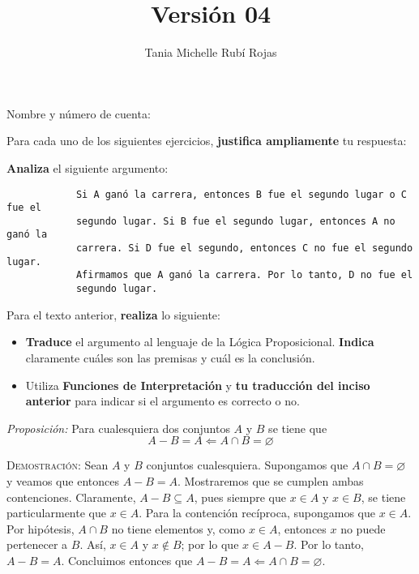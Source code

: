 \documentclass[oneside]{style}
\title{Versión 04}
\author{Tania Michelle Rubí Rojas}
\begin{document}
\maketitle

\vspace{5mm}
\noindent
Nombre y número de cuenta: \hrulefill\

\vspace*{5mm}
Para cada uno de los siguientes ejercicios, \textbf{justifica ampliamente} tu 
respuesta:

\begin{questions}[label=\protect\circled{\bfseries\arabic*}]

    \question
    {
        \textbf{Analiza} el siguiente argumento:
        \begin{verbatim}
            Si A ganó la carrera, entonces B fue el segundo lugar o C fue el 
            segundo lugar. Si B fue el segundo lugar, entonces A no ganó la 
            carrera. Si D fue el segundo, entonces C no fue el segundo lugar. 
            Afirmamos que A ganó la carrera. Por lo tanto, D no fue el 
            segundo lugar. 
        \end{verbatim}

        Para el texto anterior, \textbf{realiza} lo siguiente:
        \begin{itemize}
            \item \textbf{Traduce} el argumento al lenguaje de la Lógica 
            Proposicional. \textbf{Indica} claramente cuáles son las premisas y
            cuál es la conclusión. 
            
            \item Utiliza \textbf{Funciones de Interpretación} y \textbf{tu 
            traducción del inciso anterior} para indicar si el argumento es 
            correcto o no. 
        \end{itemize}
    }  

    \question
    {
        \textit{Proposición:} Para cualesquiera dos conjuntos $A$ y $B$ se tiene 
        que 
        \begin{equation*}
            A - B = A \Leftarrow A \cap B = \varnothing
        \end{equation*}

        \textsc{Demostración}: Sean $A$ y $B$ conjuntos cualesquiera. 
        Supongamos que $A \cap B = \varnothing$ y veamos que entonces 
        $A - B = A$. Mostraremos que se cumplen ambas contenciones. Claramente, 
        $A - B \subseteq A$, pues siempre que $x \in A$ y $x \in B$, se tiene 
        particularmente que $x \in A$. Para la contención recíproca, supongamos 
        que $x \in A$. Por hipótesis, $A \cap B$ no tiene elementos y, como $x \in A$, entonces $x$ no 
        puede pertenecer a $B$. Así, $x \in A$ y $x \notin B$; por lo que 
        $x \in A - B$. Por lo tanto, $A - B = A$. Concluimos entonces que 
        $A - B = A \Leftarrow A \cap B = \varnothing$.

}
\end{questions}
\end{document}
